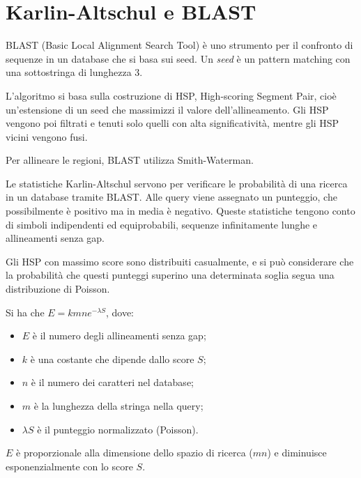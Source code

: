 \section{Karlin-Altschul e BLAST}
BLAST (Basic Local Alignment Search Tool) è uno strumento per il confronto di sequenze in un database che si basa sui seed. Un \textit{seed} è un pattern matching con una sottostringa di lunghezza 3.

L'algoritmo si basa sulla costruzione di HSP, High-scoring Segment Pair, cioè un'estensione di un seed che massimizzi il valore dell'allineamento. Gli HSP vengono poi filtrati e tenuti solo quelli con alta significatività, mentre gli HSP vicini vengono fusi.

Per allineare le regioni, BLAST utilizza Smith-Waterman.

Le statistiche Karlin-Altschul servono per verificare le probabilità di una ricerca in un database tramite BLAST. Alle query viene assegnato un punteggio, che possibilmente è positivo ma in media è negativo. Queste statistiche tengono conto di simboli indipendenti ed equiprobabili, sequenze infinitamente lunghe e allineamenti senza gap.

Gli HSP con massimo score sono distribuiti casualmente, e si può considerare che la probabilità che questi punteggi superino una determinata soglia segua una distribuzione di Poisson.

Si ha che $E = kmne^{-\lambda S}$, dove:
\begin{itemize}
	\item $E$ è il numero degli allineamenti senza gap;
	\item $k$ è una costante che dipende dallo score $S$;
	\item $n$ è il numero dei caratteri nel database;
	\item $m$ è la lunghezza della stringa nella query;
	\item $\lambda S$ è il punteggio normalizzato (Poisson).
\end{itemize}

$E$ è proporzionale alla dimensione dello spazio di ricerca ($mn$) e diminuisce esponenzialmente con lo score $S$.